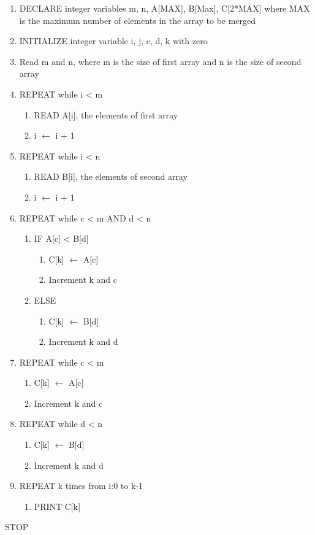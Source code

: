 \documentclass{article}
\begin{document}
\begin{flushleft}
\begin{enumerate}
\item DECLARE integer variables m, n, A[MAX], B[Max], C[2*MAX] where MAX is the maximum number of elements in the array to be merged
\item  INITIALIZE integer variable i, j, c, d, k with zero
\item  Read m and n, where m is the size of first array and n is the size of second array
\item REPEAT while i < m
\begin{enumerate}
\item READ A[i], the elements of first array
\item  i $\leftarrow$ i + 1
\end{enumerate}
\item REPEAT while i < n
\begin{enumerate}
\item READ B[i], the elements of second array
\item  i $\leftarrow$ i + 1
\end{enumerate}
\item REPEAT while c < m AND d < n
\begin{enumerate}
    \item IF A[c] < B[d]
    \begin{enumerate}
        \item C[k] $\leftarrow$ A[c]
        \item Increment k and c
    \end{enumerate}
    \item ELSE
    \begin{enumerate}
        \item C[k] $\leftarrow$ B[d]
        \item Increment k and d
    \end{enumerate}
\end{enumerate}
\item REPEAT while c < m 
\begin{enumerate}
    \item C[k] $\leftarrow$ A[c]
    \item Increment k and c
\end{enumerate}
\item REPEAT while d < n
\begin{enumerate}
    \item C[k] $\leftarrow$ B[d]
    \item Increment k and d
\end{enumerate}
\item REPEAT k times from i:0 to k-1
\begin{enumerate}
    \item PRINT C[k]
\end{enumerate}

\end{enumerate}
\end{flushleft}
STOP
\end{document}
